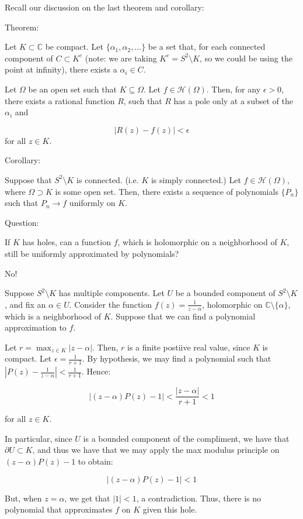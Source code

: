 \documentclass[10pt]{article}
\newcommand{\calH}{\mathcal{H}}
\begin{document}
Recall our discussion on the last theorem and corollary:

Theorem:

Let $K \subset \mathbb{C}$ be compact. Let $\{ \alpha_1, \alpha_2,... \}$ be a set that, for each connected component of $C \subset K^c$ (note: we are taking $K^c = S^2 \setminus K$, so we could be using the point at infinity), there exists a $\alpha_i \in C$.

Let $\Omega$ be an open set such that $K \subseteq \Omega$. Let $f \in \calH(\Omega)$. Then, for any $\epsilon > 0$, there exists a rational function $R$, such that $R$ has a pole only at a subset of the $\alpha_i$ and

$$ |R(z) - f(z) |< \epsilon $$ for all $z \in K$.

Corollary:

Suppose that $S^2 \setminus K$ is connected. (i.e. $K$ is simply connected.) Let $f \in \calH(\Omega)$, where $\Omega \supset K$ is some open set. Then, there exists a sequence of polynomials $\{ P_n \}$ such that $P_n \to f$ uniformly on $K$.

Question:

If $K$ has holes, can a function $f$, which is holomorphic on a neighborhood of $K$, still be uniformly approximated by polynomials?

No!

Suppose $S^2 \setminus K$ has multiple components. Let $U$ be a bounded component of $S^2 \setminus K$, and fix an $\alpha \in U$. Consider the function $f(z) = \frac{1}{z - \alpha}$, holomorphic on $\mathbb{C} \setminus \{ \alpha \}$, which is a neighborhood of $K$. Suppose that we can find a polynomial approximation to $f$.

Let $r = \max_{z \in K} |z - \alpha|$. Then, $r$ is a finite postiive real value, since $K$ is compact. Let $\epsilon = \frac{1}{r+1}$. By hypothesis, we may find a polynomial such that $\left|P(z) - \frac{1}{z - \alpha}\right|  < \frac{1}{r+1}$. Hence:

$$ \left| (z- \alpha) P(z) - 1 \right|< \frac{|z - \alpha|}{r+1} < 1 $$

for all $z \in K$.

In particular, since $U$ is a bounded component of the compliment, we have that $\partial U \subset K$, and thus we have that we may apply the max modulus principle on $(z - \alpha) P(z) - 1$ to obtain:

$$ |(z - \alpha) P(z) - 1 | < 1$$

But, when $z = \alpha$, we get that $|1| < 1$, a contradiction. Thus, there is no polynomial that approximates $f$ on $K$ given this hole.
\end{document}
